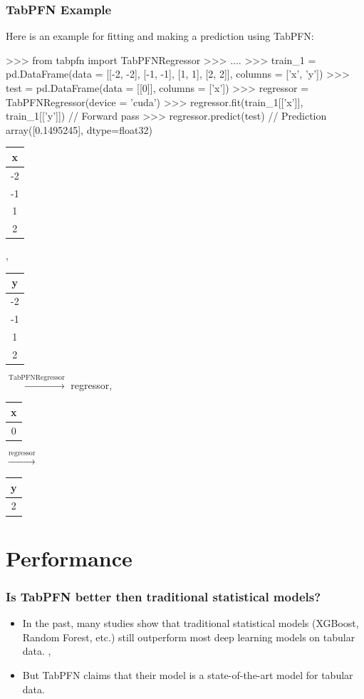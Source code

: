 \documentclass[compress]{beamer}
\begin{document}
\begin{frame}[fragile]\frametitle{TabPFN Example}
	Here is an example for fitting and making a prediction using TabPFN:
	\begin{pythoncode}
		>>> from tabpfn import TabPFNRegressor
		>>> ....
		>>> train_1 = pd.DataFrame(data = [[-2, -2], [-1, -1], [1, 1], [2, 2]],
		columns = ['x', 'y'])
		>>> test = pd.DataFrame(data = [[0]], columns = ['x'])
		>>> regressor = TabPFNRegressor(device = 'cuda')
		>>> regressor.fit(train_1[['x']], train_1[['y']]) // Forward pass
		>>> regressor.predict(test) // Prediction
		    array([0.1495245], dtype=float32)
	\end{pythoncode}
	\begin{tabular}{|c|}
		\hline
		\textbf{x} \\ \hline
		-2 \\ \hline
		-1 \\ \hline
		1 \\ \hline
		2 \\ \hline
	\end{tabular}, 
	\begin{tabular}{|c|}
	\hline
	\textbf{y} \\ \hline
	-2 \\ \hline
	-1 \\ \hline
	1 \\ \hline
	2 \\ \hline
	\end{tabular} $\xrightarrow{\text{TabPFNRegressor}}$ regressor, \begin{tabular}{|c|}
	\hline
	\textbf{x}  \\ \hline
	0  \\ \hline
	\end{tabular}  $\xrightarrow{\text{regressor}}$ \begin{tabular}{|c|}
	\hline
	\textbf{y}  \\ \hline
	2 \\ \hline
	\end{tabular}
	
\end{frame}

\section{Performance}
\begin{frame}\frametitle{Is TabPFN better then traditional statistical models?}
	\begin{itemize}
		\item In the past, many studies show that traditional statistical models (XGBoost, Random Forest, etc.) still outperform most deep learning models on tabular data. \cite{Shwartz-Ziv2021-mo}, \cite{Grinsztajn2022-fl}
		\item But TabPFN claims that their model is a state-of-the-art model for tabular data.
	\end{itemize}
\end{frame}
\end{document}
